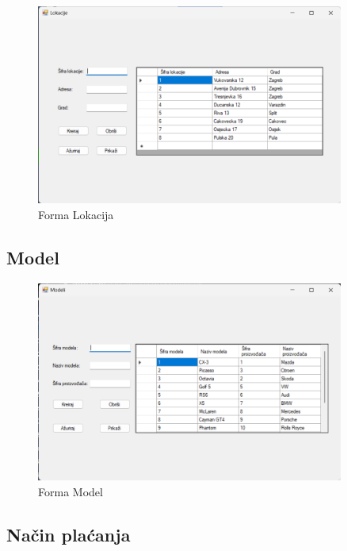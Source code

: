 \documentclass[]{foi}
\begin{document}
\begin{figure}[!ht]
    \centering
    \includegraphics[width=0.9\textwidth]{slike/lokacija.png}
    \caption{Forma Lokacija}
    \label{fig:lokacija}
\end{figure}

\subsection{Model}

\begin{figure}[!ht]
    \centering
    \includegraphics[width=0.9\textwidth]{slike/model.png}
    \caption{Forma Model}
    \label{fig:model}
\end{figure}
\newpage

\subsection{Način plaćanja}
\end{document}
